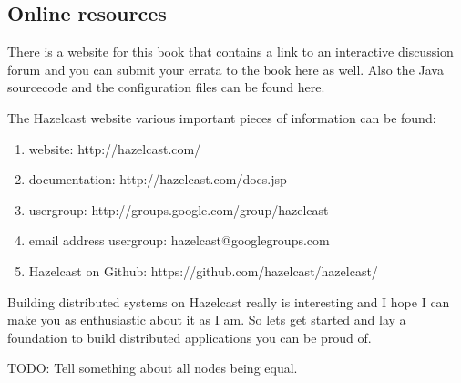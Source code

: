 \subsection*{Online resources}
There is a website for this book that contains a link to an interactive discussion forum and you can submit your errata to the book here as well. Also the Java sourcecode and the configuration files can be found here. 

The Hazelcast website various important pieces of information can be found:
\begin{enumerate}
\item website: http://hazelcast.com/
\item documentation: http://hazelcast.com/docs.jsp
\item usergroup: http://groups.google.com/group/hazelcast
\item email address usergroup: hazelcast@googlegroups.com
\item Hazelcast on Github: https://github.com/hazelcast/hazelcast/
\end{enumerate}

Building distributed systems on Hazelcast really is interesting and I hope I can make you as enthusiastic about it as I am. So lets get started and lay a foundation to build distributed applications you can be proud of.

TODO: Tell something about all nodes being equal.
